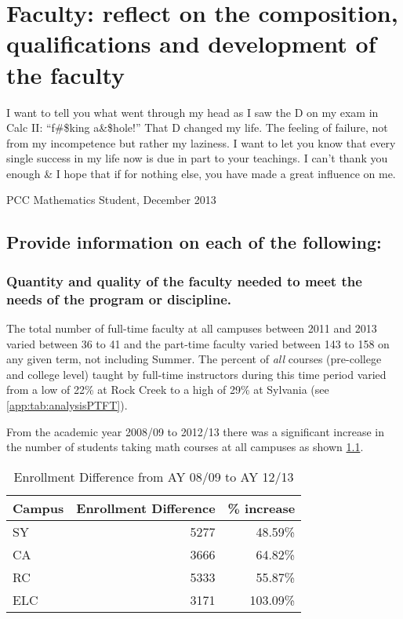 \chapter[Faculty composition and qualifications]{Faculty:  reflect on the
composition, qualifications and development of the faculty}
\epigraph{ %
	I want to tell you what went through my head as I saw the D on my  exam in
	Calc II:  ``f\#\$king a\&\$hole!''  That D changed my life.  The feeling of
	failure, not from my incompetence but rather my laziness.
	I want to let you know that every single success in my life now is due in part
	to your teachings.  I can't thank you enough \& I hope that if for nothing
	else, you have made a great influence on me.}{PCC Mathematics
Student, December 2013}

\section[Faculty composition]{Provide information on each of the following:}
\subsection[Quantity and quality of the faculty]{Quantity and quality of the faculty needed to meet the needs of the
program or discipline.}
The total number of full-time faculty at all campuses between 2011 and 2013
varied between 36 to 41 and the
part-time faculty varied between 143 to 158 on any given term,  not including
Summer.     The percent of \emph{all} courses (pre-college and college level)
taught by full-time instructors during this time period varied from a low of
22\% at Rock Creek to a high of 29\% at Sylvania (see
\cref{app:tab:analysisPTFT}).

From the academic year 2008/09 to 2012/13 there was a significant increase in the
number of students taking math courses at all campuses as shown
\cref{reflect:tab:enrollment}.
\begin{table}[!htb]
	\centering
	\caption{Enrollment Difference from AY 08/09 to AY 12/13}
	\label{reflect:tab:enrollment}
	\begin{tabular}{lrr}
		\toprule
		Campus & Enrollment Difference & \% increase \\
		\midrule
		SY     & 5277                  & 48.59\%     \\
		CA     & 3666                  & 64.82\%     \\
		RC     & 5333                  & 55.87\%     \\
		ELC    & 3171                  & 103.09\%    \\
		\bottomrule
	\end{tabular}
\end{table}

